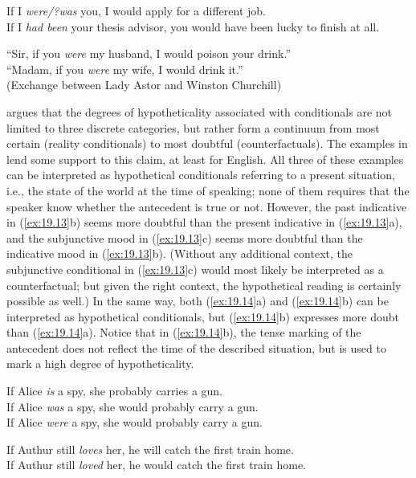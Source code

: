 \ea \label{ex:19.11}
\ea  If I \textit{were/?was} you, I would apply for a different job.\\
\ex If I \textit{had been} your thesis advisor, you would have been lucky to finish at all.
                       \z
\z

\ea \label{ex:19.12}
“Sir, if you \textit{were} my husband, I would poison your drink.”\\
“Madam, if you \textit{were} my wife, I would drink it.”\\
  (Exchange between Lady Astor and Winston Churchill)
\z


\citet{Comrie1986} argues that the degrees of hypotheticality associated with conditionals are not limited to three discrete categories, but rather form a continuum from most certain (reality conditionals) to most doubtful (counterfactuals). The examples in  lend some support to this claim, at least for English. All three of these examples can be interpreted as hypothetical conditionals referring to a present situation, i.e., the state of the world at the time of speaking; none of them requires that the speaker know whether the antecedent is true or not. However, the past indicative in (\ref{ex:19.13}b) seems more doubtful than the present indicative in (\ref{ex:19.13}a), and the subjunctive mood in (\ref{ex:19.13}c) seems more doubtful than the indicative mood in (\ref{ex:19.13}b). (Without any additional context, the subjunctive conditional in (\ref{ex:19.13}c) would most likely be interpreted as a counterfactual; but given the right context, the hypothetical reading is certainly possible as well.) In the same way, both (\ref{ex:19.14}a) and (\ref{ex:19.14}b) can be interpreted as hypothetical conditionals, but (\ref{ex:19.14}b) expresses more doubt than (\ref{ex:19.14}a). Notice that in (\ref{ex:19.14}b), the tense marking of the antecedent does not reflect the time of the described situation, but is used to mark a high degree of hypotheticality.


\ea \label{ex:19.13}
\ea  If Alice \textit{is} a spy, she probably carries a gun.\\
\ex If Alice \textit{was} a spy, she would probably carry a gun.\\
\ex If Alice \textit{were} a spy, she would probably carry a gun.
                       \z
\z

\ea \label{ex:19.14}
\ea  If Authur still \textit{loves} her, he will catch the first train home.\\
\ex If Authur still \textit{loved} her, he would catch the first train home.
                       \z
\z


